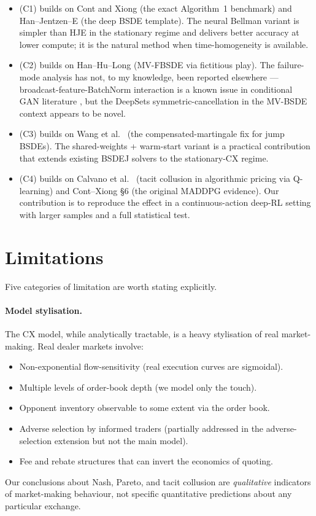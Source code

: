 \begin{itemize}[leftmargin=2em]
  \item (C1) builds on Cont and Xiong \cite{cont2024} (the exact Algorithm~1 benchmark) and Han--Jentzen--E \cite{han2018} (the deep BSDE template). The neural Bellman variant is simpler than HJE in the stationary regime and delivers better accuracy at lower compute; it is the natural method when time-homogeneity is available.
  \item (C2) builds on Han--Hu--Long \cite{han2022} (MV-FBSDE via fictitious play). The failure-mode analysis has not, to my knowledge, been reported elsewhere --- broadcast-feature-BatchNorm interaction is a known issue in conditional GAN literature \cite{miyato2018}, but the DeepSets symmetric-cancellation in the MV-BSDE context appears to be novel.
  \item (C3) builds on Wang et al.\ \cite{wang2023} (the compensated-martingale fix for jump BSDEs). The shared-weights + warm-start variant is a practical contribution that extends existing BSDEJ solvers to the stationary-CX regime.
  \item (C4) builds on Calvano et al.\ \cite{calvano2020} (tacit collusion in algorithmic pricing via Q-learning) and Cont--Xiong \cite{cont2024} \S6 (the original MADDPG evidence). Our contribution is to reproduce the effect in a continuous-action deep-RL setting with larger samples and a full statistical test.
\end{itemize}

\section{Limitations}
\label{sec:limitations}

Five categories of limitation are worth stating explicitly.

\paragraph{Model stylisation.}  The CX model, while analytically tractable, is a heavy stylisation of real market-making. Real dealer markets involve:
\begin{itemize}
  \item Non-exponential flow-sensitivity (real execution curves are sigmoidal).
  \item Multiple levels of order-book depth (we model only the touch).
  \item Opponent inventory observable to some extent via the order book.
  \item Adverse selection by informed traders (partially addressed in the adverse-selection extension but not the main model).
  \item Fee and rebate structures that can invert the economics of quoting.
\end{itemize}
Our conclusions about Nash, Pareto, and tacit collusion are \emph{qualitative} indicators of market-making behaviour, not specific quantitative predictions about any particular exchange.

